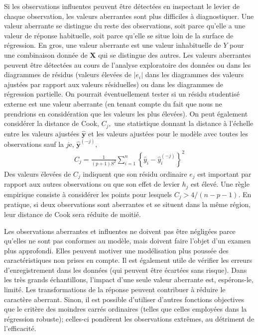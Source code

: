 \documentclass[
  11pt,
  letterpaper,
]{scrbook}
\theoremstyle{plain}
\theoremstyle{plain}
\theoremstyle{definition}
\theoremstyle{definition}
\theoremstyle{remark}
\begin{document}
Si les observations influentes peuvent être détectées en inspectant le
levier de chaque observation, les valeurs aberrantes sont plus
difficiles à diagnostiquer. Une valeur aberrante se distingue du reste
des observations, soit parce qu'elle a une valeur de réponse habituelle,
soit parce qu'elle se situe loin de la surface de régression. En gros,
une valeur aberrante est une valeur inhabituelle de \(Y\) pour une
combinaison donnée de \(\mathbf{X}\) qui se distingue des autres. Les
valeurs aberrantes peuvent être détectées au cours de l'analyse
exploratoire des données ou dans les diagrammes de résidus (valeurs
élevées de \(|e_i|\) dans les diagrammes des valeurs ajustées par
rapport aux valeurs résiduelles) ou dans les diagrammes de régression
partielle. On pourrait éventuellement tester si un résidu studentisé
externe est une valeur aberrante (en tenant compte du fait que nous ne
prendrions en considération que les valeurs les plus élevées). On peut
également considérer la distance de Cook, \(C_j,\) une statistique
donnant la distance à l'échelle entre les valeurs ajustées
\(\hat{\boldsymbol{y}}\) et les valeurs ajustées pour le modèle avec
toutes les observations sauf la \(j\)e, \(\hat{\boldsymbol{y}}^{(-j)},\)
\begin{align*}
C_j = \frac{1}{(p+1)S^2} \sum_{i=1}^n \left\{\hat{y}_i - \hat{y}_{i}^{(-j)}\right\}^2
\end{align*} Des valeurs élevées de \(C_j\) indiquent que son résidu
ordinaire \(e_j\) est important par rapport aux autres observations ou
que son effet de levier \(h_j\) est élevé. Une règle empirique consiste
à considérer les points pour lesquels \(C_j > 4/(n-p-1).\) En pratique,
si deux observations sont aberrantes et se situent dans la même région,
leur distance de Cook sera réduite de moitié.

Les observations aberrantes et influentes ne doivent pas être négligées
parce qu'elles ne sont pas conformes au modèle, mais doivent faire
l'objet d'un examen plus approfondi. Elles peuvent motiver une
modélisation plus poussée des caractéristiques non prises en compte. Il
est également utile de vérifier les erreurs d'enregistrement dans les
données (qui peuvent être écartées sans risque). Dans les très grands
échantillons, l'impact d'une seule valeur aberrante est, espérons-le,
limité. Les transformations de la réponse peuvent contribuer à réduire
le caractère aberrant. Sinon, il est possible d'utiliser d'autres
fonctions objectives que le critère des moindres carrés ordinaires
(telles que celles employées dans la régression robuste); celles-ci
pondèrent les observations extrêmes, au détriment de l'efficacité.
\end{document}
